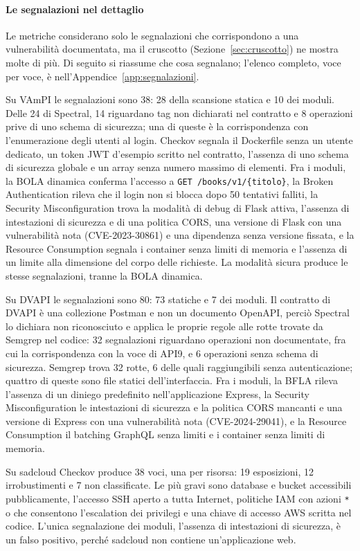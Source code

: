 \paragraph{Le segnalazioni nel dettaglio}
Le metriche considerano solo le segnalazioni che corrispondono a una
vulnerabilità documentata, ma il cruscotto (Sezione~\ref{sec:cruscotto}) ne
mostra molte di più. Di seguito si riassume che cosa segnalano; l'elenco
completo, voce per voce, è nell'Appendice~\ref{app:segnalazioni}.

Su VAmPI le segnalazioni sono 38: 28 della scansione statica e 10 dei moduli.
Delle 24 di Spectral, 14 riguardano tag non dichiarati nel contratto e 8
operazioni prive di uno schema di sicurezza; una di queste è la corrispondenza
con l'enumerazione degli utenti al login. Checkov segnala il Dockerfile senza
un utente dedicato, un token JWT d'esempio scritto nel contratto, l'assenza di
uno schema di sicurezza globale e un array senza numero massimo di elementi.
Fra i moduli, la BOLA dinamica conferma l'accesso a \texttt{GET
/books/v1/\{titolo\}}, la Broken Authentication rileva che il login non si blocca
dopo 50 tentativi falliti, la Security Misconfiguration trova la modalità di
debug di Flask attiva, l'assenza di intestazioni di sicurezza e di una politica
CORS, una versione di Flask con una vulnerabilità nota (CVE-2023-30861) e una
dipendenza senza versione fissata, e la Resource Consumption segnala i container
senza limiti di memoria e l'assenza di un limite alla dimensione del corpo delle
richieste. La modalità sicura
produce le stesse segnalazioni, tranne la BOLA dinamica.

Su DVAPI le segnalazioni sono 80: 73 statiche e 7 dei moduli. Il contratto di
DVAPI è una collezione Postman e non un documento OpenAPI, perciò Spectral lo
dichiara non riconosciuto e applica le proprie regole alle rotte trovate da
Semgrep nel codice: 32 segnalazioni riguardano operazioni non documentate, fra
cui la corrispondenza con la voce di API9, e 6 operazioni senza schema di
sicurezza. Semgrep trova 32 rotte, 6 delle quali raggiungibili senza
autenticazione; quattro di queste sono file statici dell'interfaccia. Fra i moduli, la BFLA rileva
l'assenza di un diniego predefinito nell'applicazione Express, la Security
Misconfiguration le intestazioni di sicurezza e la politica CORS mancanti e una
versione di Express con una vulnerabilità nota (CVE-2024-29041), e la Resource
Consumption il batching GraphQL senza limiti e i container senza limiti di
memoria.

Su sadcloud Checkov produce 38 voci, una per risorsa: 19 esposizioni, 12
irrobustimenti e 7 non classificate. Le più gravi sono database e bucket
accessibili pubblicamente, l'accesso SSH aperto a tutta Internet, politiche IAM
con azioni \texttt{*} o che consentono l'escalation dei privilegi e una chiave
di accesso AWS scritta nel codice. L'unica segnalazione dei moduli, l'assenza di
intestazioni di sicurezza, è un falso positivo, perché sadcloud non contiene
un'applicazione web.

